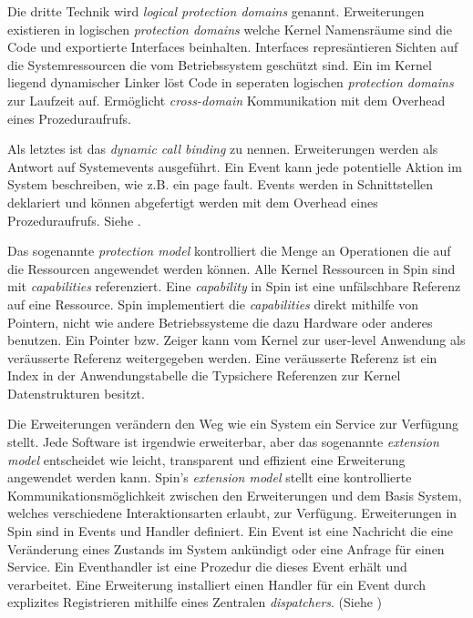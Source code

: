 \documentclass[9pt,technote]{IEEEtran}
\begin{document}
      Die dritte Technik wird \textit{logical protection domains} genannt. Erweiterungen existieren in logischen 
      \textit{protection domains} welche Kernel Namensr\"aume
      sind die Code und exportierte Interfaces beinhalten. Interfaces repres\"antieren Sichten auf die Systemressourcen die vom Betriebssystem gesch\"utzt sind.
      Ein im Kernel liegend dynamischer Linker l\"ost Code in seperaten logischen \textit{protection domains} zur Laufzeit auf.
      Erm\"oglicht \textit{cross-domain} Kommunikation mit dem Overhead eines Prozeduraufrufs.
      
      Als letztes ist das \textit{dynamic call binding} zu nennen. Erweiterungen werden als Antwort auf Systemevents ausgef\"uhrt.
      Ein Event kann jede potentielle Aktion
      im System beschreiben, wie z.B. ein page fault. Events werden in Schnittstellen deklariert und k\"onnen abgefertigt werden mit dem Overhead 
      eines Prozeduraufrufs. Siehe \cite[S. 267 f]{inproc:spin}.
      
      Das sogenannte \textit{protection model} kontrolliert die Menge an Operationen die auf die Ressourcen angewendet werden k\"onnen.
      Alle Kernel Ressourcen in Spin sind mit \textit{capabilities} referenziert. 
      Eine \textit{capability} in Spin ist eine unf\"alschbare Referenz auf eine Ressource.
      Spin implementiert die \textit{capabilities} direkt mithilfe von Pointern, nicht wie andere Betriebssysteme die dazu Hardware oder anderes benutzen.
      Ein Pointer bzw. Zeiger kann vom Kernel zur user-level Anwendung als ver\"ausserte Referenz weitergegeben werden.
      Eine ver\"ausserte Referenz ist ein Index in der Anwendungstabelle die Typsichere Referenzen zur Kernel Datenstrukturen besitzt.
      
      Die Erweiterungen ver\"andern den Weg wie ein System ein Service zur Verf\"ugung stellt. Jede Software ist irgendwie erweiterbar, 
      aber das sogenannte \textit{extension model}
      entscheidet wie leicht, transparent und effizient eine Erweiterung angewendet werden kann. 
      Spin's \textit{extension model} stellt eine kontrollierte Kommunikationsm\"oglichkeit
      zwischen den Erweiterungen und dem Basis System, welches verschiedene Interaktionsarten erlaubt, zur Verf\"ugung.
      Erweiterungen in Spin sind in Events und Handler definiert. 
      Ein Event ist eine Nachricht die eine Ver\"anderung eines Zustands im System ank\"undigt oder eine Anfrage f\"ur einen Service.
      Ein Eventhandler ist eine Prozedur die dieses Event erh\"alt und verarbeitet. 
      Eine Erweiterung installiert einen Handler f\"ur ein Event durch explizites Registrieren mithilfe eines Zentralen 
      \textit{dispatchers}. (Siehe \cite[S. 272]{inproc:spin})
      
\end{document}
